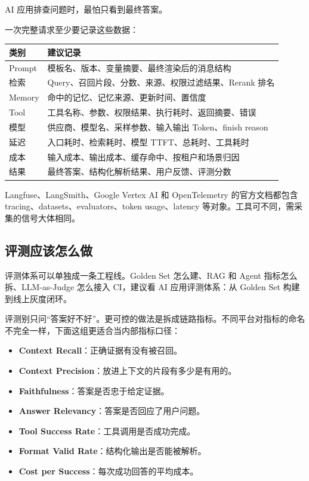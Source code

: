 \documentclass[9pt,a4paper,twocolumn]{ctexart}
\begin{document}
AI 应用排查问题时，最怕只看到最终答案。



一次完整请求至少要记录这些数据：


{\footnotesize
\begin{tabular}{|p{}|p{}|}
\hline
\textbf{类别} & \textbf{建议记录} \\
\hline
Prompt & 模板名、版本、变量摘要、最终渲染后的消息结构 \\
\hline
检索 & Query、召回片段、分数、来源、权限过滤结果、Rerank 排名 \\
\hline
Memory & 命中的记忆、记忆来源、更新时间、置信度 \\
\hline
Tool & 工具名称、参数、权限结果、执行耗时、返回摘要、错误 \\
\hline
模型 & 供应商、模型名、采样参数、输入输出 Token、finish reason \\
\hline
延迟 & 入口耗时、检索耗时、模型 TTFT、总耗时、工具耗时 \\
\hline
成本 & 输入成本、输出成本、缓存命中、按租户和场景归因 \\
\hline
结果 & 最终答案、结构化解析结果、用户反馈、评测分数 \\
\hline
\end{tabular}
}



Langfuse、LangSmith、Google Vertex AI 和 OpenTelemetry 的官方文档都包含 tracing、datasets、evaluators、token usage、latency 等对象。工具可不同，需采集的信号大体相同。



\subsection*{评测应该怎么做}


评测体系可以单独成一条工程线。Golden Set 怎么建、RAG 和 Agent 指标怎么拆、LLM-as-Judge 怎么接入 CI，建议看 AI 应用评测体系：从 Golden Set 构建到线上灰度闭环。



评测别只问“答案好不好”。更可控的做法是拆成链路指标。不同平台对指标的命名不完全一样，下面这组更适合当内部指标口径：


\begin{itemize}[itemsep=1pt, topsep=2pt]
  \item \textbf{Context Recall}：正确证据有没有被召回。
  \item \textbf{Context Precision}：放进上下文的片段有多少是有用的。
  \item \textbf{Faithfulness}：答案是否忠于给定证据。
  \item \textbf{Answer Relevancy}：答案是否回应了用户问题。
  \item \textbf{Tool Success Rate}：工具调用是否成功完成。
  \item \textbf{Format Valid Rate}：结构化输出是否能被解析。
  \item \textbf{Cost per Success}：每次成功回答的平均成本。
\end{itemize}
\end{document}
